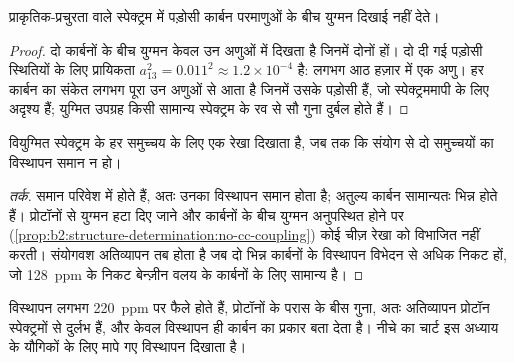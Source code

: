 \begin{proposition}[कोई कार्बन--कार्बन युग्मन नहीं]\label{prop:b2:structure-determination:no-cc-coupling}
प्राकृतिक-प्रचुरता वाले  स्पेक्ट्रम में पड़ोसी कार्बन परमाणुओं के बीच युग्मन
दिखाई नहीं देते।
\end{proposition}

\begin{proof}
दो कार्बनों के बीच युग्मन केवल उन अणुओं में दिखता है जिनमें दोनों  हों। दो दी गई
पड़ोसी स्थितियों के लिए प्रायिकता $a_{13}^2 = 0.011^2 \approx 1.2 \times 10^{-4}$ है: लगभग आठ हज़ार में एक
अणु। हर कार्बन का संकेत लगभग पूरा उन अणुओं से आता है जिनमें उसके
पड़ोसी  हैं, जो स्पेक्ट्रममापी के लिए अदृश्य हैं; युग्मित उपग्रह किसी सामान्य स्पेक्ट्रम के रव से सौ गुना
दुर्बल होते हैं।
\end{proof}

\begin{proposition}[रेखाओं की संख्या]\label{prop:b2:structure-determination:signals}
वियुग्मित  स्पेक्ट्रम  के हर समुच्चय के लिए एक रेखा दिखाता है, जब तक कि संयोग से दो समुच्चयों का
विस्थापन समान न हो।
\end{proposition}

\begin{proof}[तर्क]
 समान परिवेश में होते हैं, अतः उनका विस्थापन समान होता है; अतुल्य कार्बन
सामान्यतः भिन्न होते हैं। प्रोटॉनों से युग्मन हटा दिए जाने और कार्बनों के बीच युग्मन अनुपस्थित होने पर
(\cref{prop:b2:structure-determination:no-cc-coupling}) कोई चीज़ रेखा को विभाजित नहीं करती। संयोगवश अतिव्यापन
तब होता है जब दो भिन्न कार्बनों के विस्थापन विभेदन से अधिक निकट हों, जो
\qty{128}{ppm} के निकट बेन्ज़ीन वलय के कार्बनों के लिए सामान्य है।
\end{proof}

विस्थापन लगभग \qty{220}{ppm} पर फैले होते हैं, प्रोटॉनों के परास के बीस गुना, अतः अतिव्यापन
प्रोटॉन स्पेक्ट्रमों से दुर्लभ हैं, और केवल विस्थापन ही कार्बन का प्रकार बता देता है। नीचे का चार्ट इस अध्याय के यौगिकों के लिए
मापे गए विस्थापन दिखाता है।

